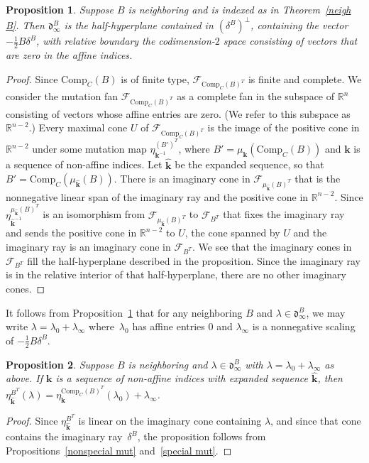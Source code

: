 \documentclass[10pt]{article}
\newtheorem{proposition}{Proposition}[section]
\theoremstyle{definition}
\theoremstyle{remark}
\numberwithin{equation}{section}
\newcommand{\reals}{\mathbb R}
\newcommand{\F}{{\mathcal F}}
\newcommand{\0}{{\mathbf{0}}}
\newcommand{\Comp}{\mathrm{Comp}_C}
\newcommand{\kk}{{\boldsymbol{k}}}
\renewcommand{\d}{{\mathfrak d}}
\begin{document}
\begin{proposition}\label{neigh im wall}
Suppose $B$ is neighboring and is indexed as in Theorem~\ref{neigh B}.
Then $\d^B_\infty$ is the half-hyperplane contained in $(\delta^B)^\perp$, containing the vector $-\frac12B\delta^B$, with relative boundary the codimension-$2$ space consisting of vectors that are zero in the affine indices.
\end{proposition}
\begin{proof}
Since $\Comp(B)$ is of finite type, $\F_{\Comp(B)^T}$ is finite and complete.
We consider the mutation fan $\F_{\Comp(B)^T}$ as a complete fan in the subspace of $\reals^n$ consisting of vectors whose affine entries are zero. 
(We refer to this subspace as $\reals^{n-2}$.)
Every maximal cone $U$ of $\F_{\Comp(B)^T}$ is the image of the positive cone in $\reals^{n-2}$ under some mutation map $\eta^{(B')^T}_{\kk^{-1}}$, where $B'=\mu_\kk(\Comp(B))$ and $\kk$ is a sequence of non-affine indices.  
Let $\widehat\kk$ be the expanded sequence, so that $B'=\Comp(\mu_{\widehat\kk}(B))$.
There is an imaginary cone in $\F_{\mu_{\widehat\kk}(B)^T}$ that is the nonnegative linear span of the imaginary ray and the positive cone in $\reals^{n-2}$.
Since $\eta^{\mu_{\widehat\kk}(B)^T}_{\widehat\kk^{-1}}$ is an isomorphism from $\F_{\mu_{\widehat\kk}(B)^T}$ to $\F_{B^T}$ that fixes the imaginary ray and sends the positive cone in $\reals^{n-2}$ to $U$, the cone spanned by $U$ and the imaginary ray is an imaginary cone in $\F_{B^T}$.
We see that the imaginary cones in $\F_{B^T}$ fill the half-hyperplane described in the proposition.
Since the imaginary ray is in the relative interior of that half-hyperplane, there are no other imaginary cones.
\end{proof}

It follows from Proposition~\ref{neigh im wall} that for any neighboring $B$ and $\lambda\in\d_\infty^B$, we may write $\lambda=\lambda_0+\lambda_\infty$ where~$\lambda_0$ has affine entries $0$ and $\lambda_\infty$ is a nonnegative scaling of $-\frac12B\delta^B$.

\begin{proposition}\label{factor eta}
  Suppose $B$ is neighboring and $\lambda\in\d_\infty^B$ with $\lambda=\lambda_0+\lambda_\infty$ as above.
If $\kk$ is a sequence of non-affine indices with expanded sequence $\widehat\kk$, then ${\eta^{B^T}_{\widehat\kk}(\lambda)=\eta_\kk^{\Comp(B)^T}(\lambda_0)+\lambda_\infty}$.
\end{proposition}
\begin{proof}
Since $\eta_{\widehat\kk}^{B^T}$ is linear on the imaginary cone containing $\lambda$, and since that cone contains the imaginary ray~$\delta^B$, the proposition follows from Propositions~\ref{nonspecial mut} and~\ref{special mut}.
\end{proof}
\end{document}
